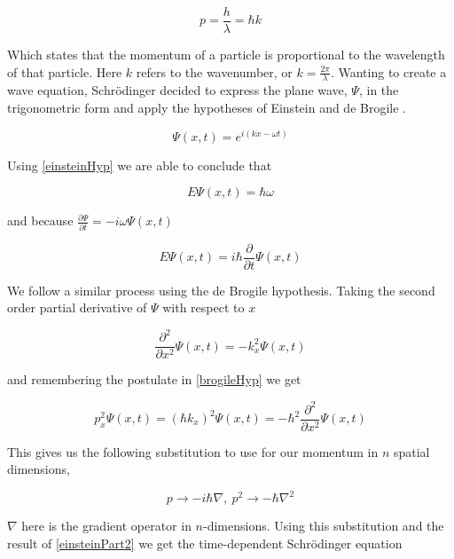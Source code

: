 \documentclass[authoryearcitations]{UoYCSproject}
\begin{document}
\begin{equation}
p = \frac{h}{\lambda} = \hbar k 
\label{brogileHyp}
\end{equation}

Which states that the momentum of a particle is proportional to the wavelength of that particle. Here $k$ refers to the 
wavenumber, or $k = \frac{2\pi}{\lambda}$. Wanting to create a wave equation, Schr\"{o}dinger decided to express the plane
wave, $\Psi$, in the trigonometric form and apply the hypotheses of Einstein and de Brogile \cite{ricardo}. 

\begin{equation}
\Psi (x, t) = e^{i(k\dot x-\omega t)}
\end{equation}

Using \ref{einsteinHyp} we are able to conclude that

\begin{equation}
E\Psi (x,t) = \hbar\omega
\label{einsteinPart}
\end{equation}

and because $\frac{\partial\Psi}{\partial t} = -i\omega\Psi (x,t)$

\begin{equation}
E\Psi (x,t) = i\hbar\frac{\partial}{\partial t}\Psi (x,t)
\label{einsteinPart2}
\end{equation}

We follow a similar process using the de Brogile hypothesis. Taking the second order partial derivative of
$\Psi$ with respect to $x$ 

$$\frac{\partial ^2}{\partial x^2}\Psi (x,t) = -k_{x}^{2}\Psi(x,t) $$

and remembering the postulate in \ref{brogileHyp} we get

\begin{equation}
p_{x}^{2}\Psi (x,t) = (\hbar k_{x})^2\Psi (x,t) = -\hbar ^2\frac{\partial ^2}{\partial x^2}\Psi (x,t)
\label{brogile2}
\end{equation}

This gives us the following substitution to use for our momentum in $n$ spatial dimensions,

\begin{equation}
p \rightarrow -i\hbar \nabla,\ p^2 \rightarrow -\hbar\nabla ^2
\label{eq:momentumSub}
\end{equation}

$\nabla$ here is the gradient operator in $n$-dimensions. Using this substitution and the result of 
\ref{einsteinPart2} we get the time-dependent Schr\"{o}dinger equation 
\end{document}
